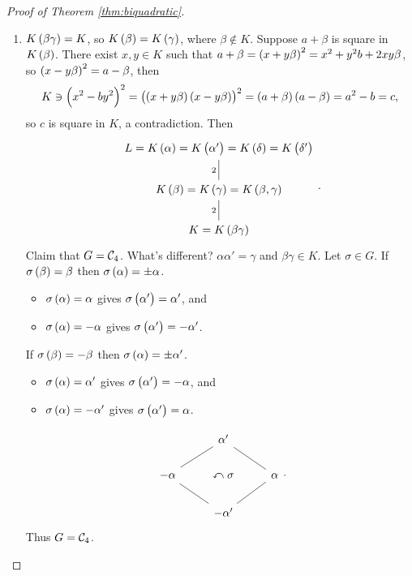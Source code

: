 \begin{proof}[Proof of Theorem \ref{thm:biquadratic}]
\begin{enumerate}
\item $ K\br{\beta\gamma} = K $, so $ K\br{\beta} = K\br{\gamma} $, where $ \beta \notin K $. Suppose $ a + \beta $ is square in $ K\br{\beta} $. There exist $ x, y \in K $ such that $ a + \beta = \br{x + y\beta}^2 = x^2 + y^2b + 2xy\beta $, so $ \br{x - y\beta}^2 = a - \beta $, then
$$ K \ni \br{x^2 - by^2}^2 = \br{\br{x + y\beta}\br{x - y\beta}}^2 = \br{a + \beta}\br{a - \beta} = a^2 - b = c, $$
so $ c $ is square in $ K $, a contradiction. Then
$$
\begin{tikzcd}
L = K\br{\alpha} = K\br{\alpha'} = K\br{\delta} = K\br{\delta'} \\
K\br{\beta} = K\br{\gamma} = K\br{\beta, \gamma} \arrow[dash]{u}{2} \\
K = K\br{\beta\gamma} \arrow[dash]{u}{2}
\end{tikzcd}.
$$
Claim that $ G = \mathcal{C}_4 $. What's different? $ \alpha\alpha' = \gamma $ and $ \beta\gamma \in K $. Let $ \sigma \in G $. If $ \sigma\br{\beta} = \beta $ then $ \sigma\br{\alpha} = \pm\alpha $.
\begin{itemize}
\item $ \sigma\br{\alpha} = \alpha $ gives $ \sigma\br{\alpha'} = \alpha' $, and
\item $ \sigma\br{\alpha} = -\alpha $ gives $ \sigma\br{\alpha'} = -\alpha' $.
\end{itemize}
If $ \sigma\br{\beta} = -\beta $ then $ \sigma\br{\alpha} = \pm\alpha' $.
\begin{itemize}
\item $ \sigma\br{\alpha} = \alpha' $ gives $ \sigma\br{\alpha'} = -\alpha $, and
\item $ \sigma\br{\alpha} = -\alpha' $ gives $ \sigma\br{\alpha'} = \alpha $.
\end{itemize}
$$
\begin{tikzcd}
& \alpha' & \\
-\alpha \arrow[dash]{ur} & \curvearrowleft \sigma & \alpha \arrow[dash]{ul} \\
& -\alpha' \arrow[dash]{ul} \arrow[dash]{ur} &
\end{tikzcd}.
$$
Thus $ G = \mathcal{C}_4 $.

\pagebreak


\end{enumerate}
\end{proof}
